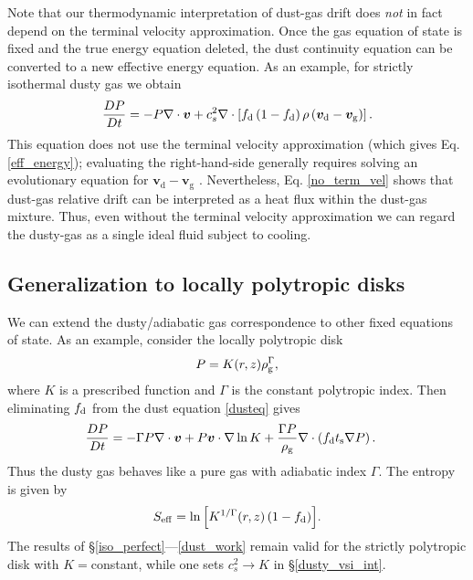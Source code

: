 {Note that our thermodynamic interpretation of dust-gas drift does
\emph{not} in fact depend on the terminal velocity approximation.   
Once the gas equation of state is fixed and the true energy equation deleted, 
the dust continuity equation can be converted to a new effective energy equation. 
As an example, for strictly isothermal dusty gas we obtain   
\begin{align}
\frac{DP}{Dt} = - P\nabla\cdot\bm{v} +
c_s^2\nabla\cdot\left[f_\mathrm{d}\left(1-f_\mathrm{d}\right)\rho\left(\bm{v}_\mathrm{d}
    - \bm{v}_\mathrm{g}\right)\right]. \label{no_term_vel}  
\end{align}
This equation does not use
the terminal velocity approximation (which gives
Eq. \ref{eff_energy}); evaluating the right-hand-side generally 
requires solving an evolutionary equation for $\bm{v}_\mathrm{d} - 
\bm{v}_\mathrm{g}$ \citep{laibe14}. Nevertheless,
Eq. \ref{no_term_vel} shows that dust-gas relative drift can be
interpreted as a heat flux within the dust-gas mixture. Thus, even 
without the terminal velocity approximation we can 
regard the dusty-gas as a single ideal fluid subject to cooling.   
}

\subsection{Generalization to locally polytropic disks}\label{gen_poly}

We can extend the dusty/adiabatic gas correspondence to 
other fixed equations of state. As an example, consider the locally
polytropic disk 
\begin{align}
  P = K(r,z)\rho_\mathrm{g}^{\Gamma}, 
\end{align}
where $K$ is a prescribed function and $\Gamma$ is the constant
polytropic index. Then eliminating $f_\mathrm{d}$ from the dust equation
\ref{dusteq} gives 
\begin{align}\label{poly_energy}
  \frac{D P}{D t} &= - \Gamma P\nabla\cdot\bm{v}  + P \bm{v}\cdot\nabla
  \ln{K} + \frac{\Gamma P}{\rho_\mathrm{g}}\nabla\cdot\left(f_\mathrm{d}t_\mathrm{s}\nabla
  P\right). 
\end{align}
Thus the dusty gas behaves like a pure gas with adiabatic index
$\Gamma$. The entropy is given by 
\begin{align}
  S_\mathrm{eff} = \ln{\left[K^{1/\Gamma}(r,z)\left(1 - f_\mathrm{d}\right)\right]}.  
\end{align}
The results of \S\ref{iso_perfect}---\ref{dust_work} remain valid for the strictly 
polytropic disk with $K=$constant, while one sets $c_s^2\to K$ in
\S\ref{dusty_vsi_int}. 




